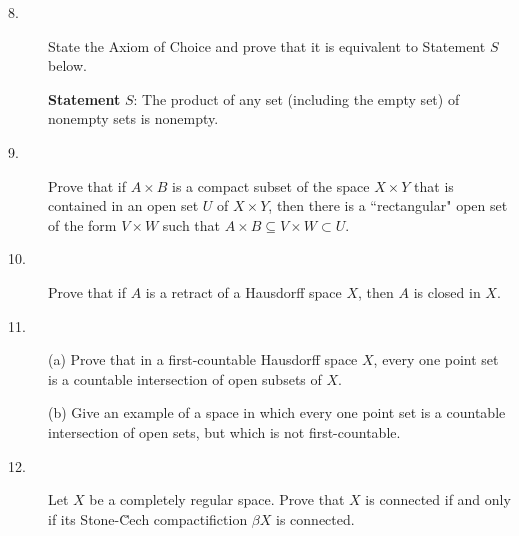 \documentclass{article}
\begin{document}
\begin{description}
\item[8.]
State the Axiom of Choice and prove that it is equivalent to Statement $S$
below.

{\bf Statement} $S$: The product of any set (including the empty set) of
nonempty sets is nonempty.

\item[9.]
Prove that if $A \times B$ is a compact subset of the space
$X \times Y$ that is contained in an open set $U$ of $X \times Y$, then there
is a ``rectangular" open set of the form $V \times W$ such that
$A \times B \subseteq V \times W \subset U$.

\item[10.]
Prove that if $A$ is a retract of a Hausdorff space $X$, then $A$ is closed
in $X$.

\item[11.] (a)
Prove that in a first-countable Hausdorff space $X$, every one point set is a
countable intersection of open subsets of $X$.

\item[\quad] (b)
Give an example of a space in which every one point set is a countable
intersection of open sets, but which is not first-countable.

\item[12.]
Let $X$ be a completely regular space. Prove that $X$ is connected if and
only if its Stone-\u Cech compactifiction $\beta X$ is connected.





\end{description}    
\end{document}
